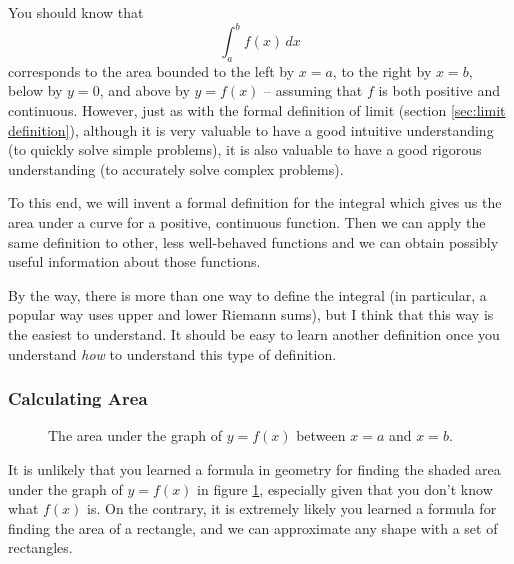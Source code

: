 \documentclass{myarticle}
\theoremstyle{nospace}
\newtheorem{old series theorem}{Theorem}
\newenvironment{series theorem}
{\begin{mdframed}\begin{old series theorem}}
    {\end{old series theorem}\end{mdframed}}
\begin{document}
You should know that
\[
  \int_a^b f(x) \,dx
\]
corresponds to the area bounded to the left by $x = a$, to the right
by $x = b$, below by $y = 0$, and above by $y = f(x)$ -- assuming that
$f$ is both positive and continuous. However, just as with the formal
definition of limit (section \ref{sec:limit definition}), although it
is very valuable to have a good intuitive understanding (to quickly
solve simple problems), it is also valuable to have a good rigorous
understanding (to accurately solve complex problems).

To this end, we will invent a formal definition for the integral which
gives us the area under a curve for a positive, continuous function.
Then we can apply the same definition to other, less well-behaved
functions and we can obtain possibly useful information about those
functions.

By the way, there is more than one way to define the integral (in
particular, a popular way uses upper and lower Riemann sums), but I
think that this way is the easiest to understand. It should be easy to
learn another definition once you understand \emph{how} to understand
this type of definition.

\subsubsection{Calculating Area}
\label{sec:integral definition area}

\begin{figure}[htb!] \centering
  \caption{The area under the graph of $y = f(x)$ between $x = a$ and
    $x = b$.}
  \label{fig:area 0}
\end{figure}

It is unlikely that you learned a formula in geometry for finding the
shaded area under the graph of $y = f(x)$ in figure \ref{fig:area 0},
especially given that you don't know what $f(x)$ is. On the contrary,
it is extremely likely you learned a formula for finding the area of a
rectangle, and we can approximate any shape with a set of rectangles.
\end{document}
